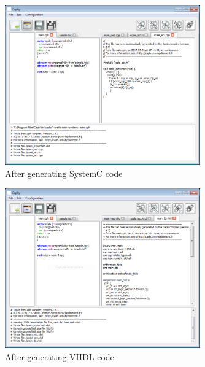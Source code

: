 \begin{figure}[h]
  \centering
  \includegraphics[width=0.75\textwidth]{figs/ide/make-systemc}
  \caption{After generating SystemC code}
  \label{fig:make-systemc}
\end{figure}

\begin{figure}[h]
  \centering
  \includegraphics[width=0.75\textwidth]{figs/ide/make-vhdl}
  \caption{After generating VHDL code}
  \label{fig:make-vhdl}
\end{figure}

